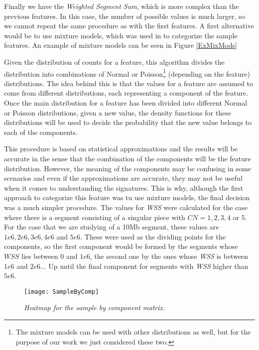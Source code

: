 \documentclass[a4paper]{article}
\begin{document}
Finally we have the \textit{Weighted Segment Sum}, which is more complex than the previous features. In this case, the number of possible values is much larger, so we cannot repeat the same procedure as with the first features. A first alternative would be to use mixture models, which was used in \cite{Geoff} to categorize the sample features. An example of mixture models can be seen in Figure \ref{ExMixMods}

 Given the distribution of counts for a feature, this algorithm divides the distribution into combinations of Normal or Poisson\footnote{The mixture models can be used with other distributions as well, but for the purpose of our work we just considered these two.} (depending on the feature) distributions. The idea behind this is that the values for a feature are assumed to come from different distributions, each representing a component of the feature. Once the main distribution for a feature has been divided into different Normal or Poisson distributions, given a new value, the density functions for these distributions will be used to decide the probability that the new value belongs to each of the components. 
 
 This procedure is based on statistical approximations and the results will be accurate in the sense that the combination of the components will be the feature distribution. However, the meaning of the components may be confusing in some scenarios and even if the approximations are accurate, they may not be useful when it comes to understanding the signatures. This is why, although the first approach to categorize this feature was tu use mixture models, the final decision was a much simpler procedure. The values for \textit{WSS} were calculated for the case where there is a segment consisting of a singular piece with $CN=1,2,3,4$ or $5$. For the case that we are studying of a 10Mb segment, these values are $1e6,2e6,3e6,4e6$ and $5e6$. These were used as the dividing points for the components, so the first component would be formed by the segments whose $WSS$ lies between $0$ and $1e6$, the second one by the ones whose \textit{WSS} is between $1e6$ and $2e6$... Up until the final component for segments with \textit{WSS} higher than $5e6$. 
 
 \begin{figure}[h] 
 	\centering
 	\texttt{[image: SampleByComp]} 
 	\caption{\textit{Heatmap for the sample by component matrix.}} \label{SampleByComp}
 \end{figure}
\end{document}
